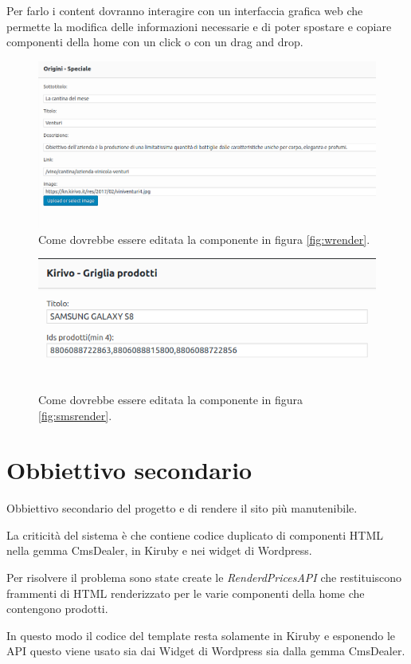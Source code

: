 Per farlo i content dovranno interagire con un interfaccia grafica web che permette
la modifica delle informazioni necessarie e di poter spostare e copiare
componenti della home con un click o con un drag and drop.


\begin{figure}
  \includegraphics[width=\textwidth]{figure/wform.png}
  \caption{Come dovrebbe essere editata la componente in figura \ref{fig:wrender}.}
  \label{fig:meseform}
\end{figure}

\begin{figure}
  \includegraphics[width=\textwidth]{figure/sms-form.png}
  \caption{Come dovrebbe essere editata la componente in figura \ref{fig:smsrender}.}
  \label{fig:smsform}
\end{figure}

\section{Obbiettivo secondario}
Obbiettivo secondario del progetto e di rendere il sito più manutenibile.

La criticità del sistema è che contiene codice duplicato di componenti HTML nella gemma CmsDealer, in Kiruby
e nei widget di Wordpress. 

Per risolvere il problema sono state create le  \emph{RenderdPricesAPI} 
che restituiscono frammenti di HTML renderizzato per le varie componenti della home che contengono prodotti.

In questo modo il codice del template resta solamente in Kiruby e esponendo le 
API questo viene usato sia dai Widget di Wordpress sia dalla gemma CmsDealer.